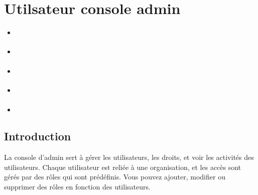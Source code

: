 \documentclass[letterpaper,10pt,french]{sphinxmanual}
\begin{document}
\section{Utilsateur \sphinxhyphen{} console admin}
\label{\detokenize{doc_admin/utilisateurs:utilsateur-console-admin}}\label{\detokenize{doc_admin/utilisateurs::doc}}\label{\detokenize{doc_admin/utilisateurs:utilisateur}}
\begin{sphinxShadowBox}
\begin{itemize}
\item {} 
\sphinxAtStartPar
{}\label{\detokenize{doc_admin/utilisateurs:id1}}{\hyperref[\detokenize{doc_admin/utilisateurs:introduction}]{}}

\item {} 
\sphinxAtStartPar
{}\label{\detokenize{doc_admin/utilisateurs:id2}}{\hyperref[\detokenize{doc_admin/utilisateurs:utilisateurs}]{}}

\item {} 
\sphinxAtStartPar
{}\label{\detokenize{doc_admin/utilisateurs:id3}}{\hyperref[\detokenize{doc_admin/utilisateurs:organismes}]{}}

\item {} 
\sphinxAtStartPar
{}\label{\detokenize{doc_admin/utilisateurs:id4}}{\hyperref[\detokenize{doc_admin/utilisateurs:roles}]{}}

\item {} 
\sphinxAtStartPar
{}\label{\detokenize{doc_admin/utilisateurs:id5}}{\hyperref[\detokenize{doc_admin/utilisateurs:autres}]{}}

\end{itemize}
\end{sphinxShadowBox}


\subsection{Introduction}
\label{\detokenize{doc_admin/utilisateurs:introduction}}
\sphinxAtStartPar
La console d’admin sert à gérer les utilisateurs, les droits, et voir les activités des utilisateurs.
Chaque utilisateur est reliée à une organisation, et les accès sont gérés par des rôles qui sont prédéfinis.
Vous pouvez ajouter, modifier ou supprimer des rôles en fonction des utilisateurs.
\end{document}
